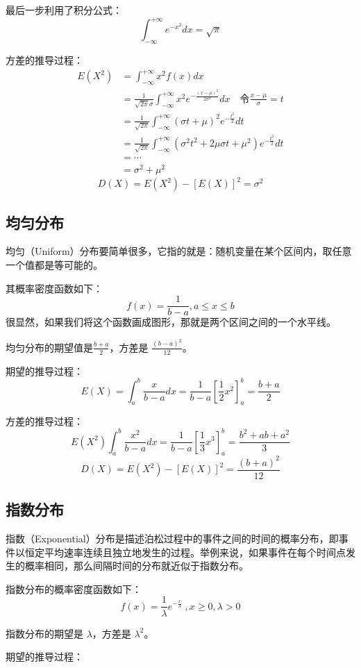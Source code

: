 \documentclass[12pt]{article}
\begin{document}
最后一步利用了积分公式：
$$
\int_{-\infty}^{+\infty}e^{-x^2}dx = \sqrt{\pi}
$$

方差的推导过程：
\begin{align}
E(X^2) &= \int_{-\infty}^{+\infty}x^2f(x)dx \\
&= \frac{1}{\sqrt{2 \pi}\sigma} \int_{-\infty}^{+\infty}x^2e^{-\frac{(x - \mu)^2}{2\sigma^2}}dx \quad \text{令} \frac{x-\mu}{\sigma} = t \\
&= \frac{1}{\sqrt{2 \pi}}\int_{-\infty}^{+\infty}(\sigma t+\mu)^2e^{-\frac{t^2}{2}}dt \\
&= \frac{1}{\sqrt{2 \pi}}\int_{-\infty}^{+\infty}({\sigma }^2t^2+2\mu\sigma t+{\mu}^2)e^{-\frac{t^2}{2}}dt \\
&= \cdots \\
&= {\sigma}^2 + {\mu}^2
\end{align}
$$
D(X) = E(X^2) - [E(X)]^2 = {\sigma}^2
$$

\subsection{均匀分布}
均匀（Uniform）分布要简单很多，它指的就是：随机变量在某个区间内，取任意一个值都是等可能的。

其概率密度函数如下：
$$
f(x) = \frac{1}{b-a} , a \le x \le b
$$
很显然，如果我们将这个函数画成图形，那就是两个区间之间的一个水平线。

均匀分布的期望值是$\frac{b+a}{2}$，方差是 $\frac{(b-a)^2}{12}$。

期望的推导过程：
$$
E(X) = \int_a^b\frac{x}{b-a}dx = \frac{1}{b-a}[\frac{1}{2}x^2]_a^b = \frac{b+a}{2}
$$

方差的推导过程：
$$
E(X^2) \int_a^b\frac{x^2}{b-a}dx = \frac{1}{b-a}[\frac{1}{3}x^3]_a^b = \frac{b^2+ab+a^2}{3}
$$
$$
D(X) = E(X^2) - [E(X)]^2 = \frac{(b+a)^2}{12}
$$

\subsection{指数分布}
指数（Exponential）分布是描述泊松过程中的事件之间的时间的概率分布，即事件以恒定平均速率连续且独立地发生的过程。举例来说，如果事件在每个时间点发生的概率相同，那么间隔时间的分布就近似于指数分布。

指数分布的概率密度函数如下：
$$
f(x) = \frac{1}{\lambda}e^{-\frac{x}{\lambda}} \; ,x \ge 0, \lambda > 0
$$

指数分布的期望是 $\lambda$，方差是 $\lambda^2$。

期望的推导过程：
\end{document}

